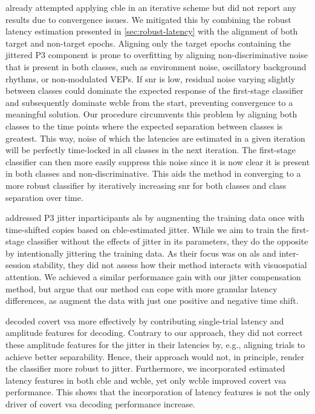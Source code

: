\textcite{Thompson2012} already attempted applying \ac{cble} in an iterative scheme
but did not report any results due to convergence issues.
We mitigated this by combining the robust latency estimation presented in
\cref{sec:robust-latency} with the alignment of both target and non-target
epochs.
Aligning only the target epochs containing the jittered P3 component is prone to
overfitting by aligning non-discriminative noise that is present in both
classes, such as environment noise, oscillatory background rhythms, or
non-modulated VEPs.
If \ac{snr} is low, residual noise varying slightly between classes could dominate
the expected response of the first-stage classifier and subsequently dominate
\ac{wcble} from the start, preventing convergence to a meaningful solution.
Our procedure circumvents this problem by aligning both classes to the time
points where the expected separation between classes is greatest.
This way, noise of which the latencies are estimated in a given iteration will be
perfectly time-locked in all classes in the next
iteration.
The first-stage classifier can then more easily suppress this noise since it is
now clear it is present in both classes and non-discriminative.
This aids the method in converging to a more robust classifier by iteratively
increasing \ac{snr} for both classes and class separation over time.

\textcite{Zisk2022} addressed P3 jitter inparticipants \ac{als} by augmenting the
training data once with time-shifted copies based on \ac{cble}-estimated jitter.
While we aim to train the first-stage classifier without the effects of jitter
in its parameters, they do the opposite by intentionally jittering the
training data.
As their focus was on \ac{als} and inter-session stability, they
did not assess how their method interacts with visuospatial attention.
We achieved a similar performance gain with our jitter compensation method, but
argue that our method can cope with more granular latency differences, as
\textcite{Zisk2022} augment the data with just one positive and negative time
shift.

\textcite{Hardiansyah2020} decoded covert \ac{vsa} more effectively by
contributing single-trial latency and amplitude features for decoding.
Contrary to our approach, they did not correct these amplitude
features for the jitter in their latencies by, e.g., aligning trials to achieve
better separability.
Hence, their approach would not, in principle, render the classifier more robust
to jitter.
Furthermore, we incorporated estimated latency features in both \ac{cble} and \ac{wcble},
yet only \ac{wcble} improved covert \ac{vsa} performance.
This shows that the incorporation of latency features is not the only driver of
covert \ac{vsa} decoding performance increase.

